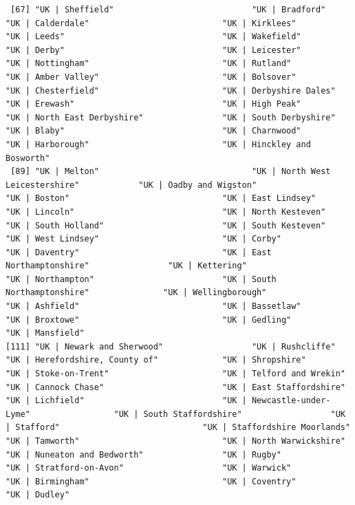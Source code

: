 \documentclass[11pt]{article}
\begin{document}
\begin{verbatim}
 [67] "UK | Sheffield"                            "UK | Bradford"                             "UK | Calderdale"                           "UK | Kirklees"                             "UK | Leeds"                                "UK | Wakefield"                            "UK | Derby"                                "UK | Leicester"                            "UK | Nottingham"                           "UK | Rutland"                              "UK | Amber Valley"                         "UK | Bolsover"                             "UK | Chesterfield"                         "UK | Derbyshire Dales"                     "UK | Erewash"                              "UK | High Peak"                            "UK | North East Derbyshire"                "UK | South Derbyshire"                     "UK | Blaby"                                "UK | Charnwood"                            "UK | Harborough"                           "UK | Hinckley and Bosworth"               
 [89] "UK | Melton"                               "UK | North West Leicestershire"            "UK | Oadby and Wigston"                    "UK | Boston"                               "UK | East Lindsey"                         "UK | Lincoln"                              "UK | North Kesteven"                       "UK | South Holland"                        "UK | South Kesteven"                       "UK | West Lindsey"                         "UK | Corby"                                "UK | Daventry"                             "UK | East Northamptonshire"                "UK | Kettering"                            "UK | Northampton"                          "UK | South Northamptonshire"               "UK | Wellingborough"                       "UK | Ashfield"                             "UK | Bassetlaw"                            "UK | Broxtowe"                             "UK | Gedling"                              "UK | Mansfield"                           
[111] "UK | Newark and Sherwood"                  "UK | Rushcliffe"                           "UK | Herefordshire, County of"             "UK | Shropshire"                           "UK | Stoke-on-Trent"                       "UK | Telford and Wrekin"                   "UK | Cannock Chase"                        "UK | East Staffordshire"                   "UK | Lichfield"                            "UK | Newcastle-under-Lyme"                 "UK | South Staffordshire"                  "UK | Stafford"                             "UK | Staffordshire Moorlands"              "UK | Tamworth"                             "UK | North Warwickshire"                   "UK | Nuneaton and Bedworth"                "UK | Rugby"                                "UK | Stratford-on-Avon"                    "UK | Warwick"                              "UK | Birmingham"                           "UK | Coventry"                             "UK | Dudley"                              

\end{verbatim}
\end{document}
